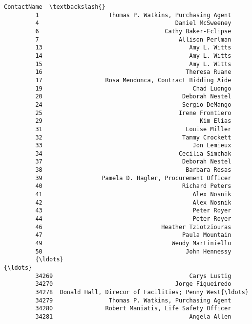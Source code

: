 \documentclass[11pt]{article}
\begin{document}
\begin{Verbatim}[commandchars=\\\{\}]
                                                      ContactName  \textbackslash{}
         1                    Thomas P. Watkins, Purchasing Agent   
         4                                       Daniel McSweeney   
         6                                    Cathy Baker-Eclipse   
         7                                        Allison Perlman   
         13                                          Amy L. Witts   
         14                                          Amy L. Witts   
         15                                          Amy L. Witts   
         16                                         Theresa Ruane   
         17                  Rosa Mendonca, Contract Bidding Aide   
         19                                           Chad Luongo   
         20                                        Deborah Nestel   
         24                                        Sergio DeMango   
         25                                       Irene Frontiero   
         29                                             Kim Elias   
         31                                         Louise Miller   
         32                                        Tammy Crockett   
         33                                           Jon Lemieux   
         34                                       Cecilia Simchak   
         37                                        Deborah Nestel   
         38                                         Barbara Rosas   
         39                 Pamela D. Hagler, Procurement Officer   
         40                                        Richard Peters   
         41                                           Alex Nosnik   
         42                                           Alex Nosnik   
         43                                           Peter Royer   
         44                                           Peter Royer   
         46                                  Heather Tziotziouras   
         47                                        Paula Mountain   
         49                                     Wendy Martiniello   
         50                                         John Hennessy   
         {\ldots}                                                  {\ldots}   
         34269                                       Carys Lustig   
         34270                                   Jorge Figueiredo   
         34278  Donald Hall, Direcor of Facilities; Penny West{\ldots}   
         34279                Thomas P. Watkins, Purchasing Agent   
         34280               Robert Maniatis, Life Safety Officer   
         34281                                       Angela Allen   

\end{Verbatim}
\end{document}

